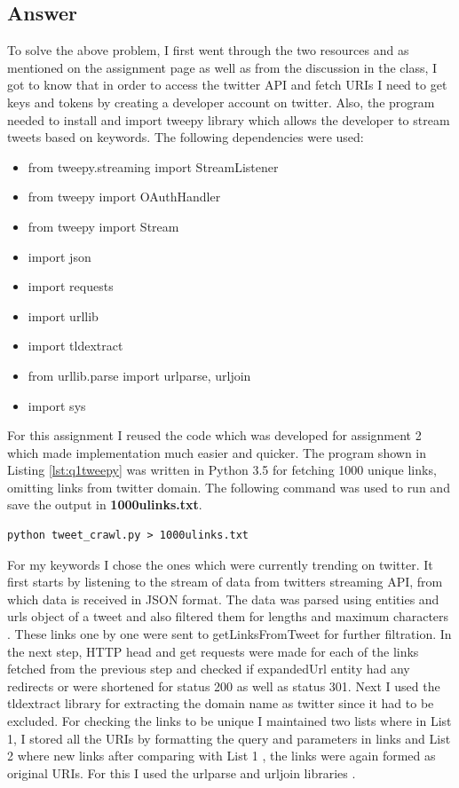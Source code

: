 \documentclass[letterpaper,11pt]{article}
\begin{document}
\subsection*{Answer}
To solve the above problem, I first went through the two resources \cite{twitterref} and \cite{twitterstreamref} as mentioned on the assignment page as well as from the discussion in the class, I got to know that in order to access the twitter API and fetch URIs I need to get keys and tokens by creating a developer account on twitter.
Also, the program needed to install and import tweepy library which allows the developer to stream tweets based on keywords. The following dependencies were used:
\begin{itemize}
  \item from tweepy.streaming import StreamListener
  \item from tweepy import OAuthHandler
  \item from tweepy import Stream
  \item import json
  \item import requests
  \item import urllib
  \item	import tldextract
  \item	from urllib.parse import urlparse, urljoin
  \item	import sys

\end{itemize}
For this assignment I reused the code which was developed for assignment 2 which made implementation much easier and quicker. The program shown in Listing \ref{lst:q1tweepy} was written in Python 3.5 for fetching 1000 unique links, omitting links from twitter domain. The following command was used to run and save the output in \textbf{1000ulinks.txt}.
\begin{lstlisting}[frame=single]
python tweet_crawl.py > 1000ulinks.txt
\end{lstlisting}


For my keywords I chose the ones which were currently trending on twitter. It first starts by listening to the stream of data from twitters streaming API, from which data is received in JSON format. The data was parsed using entities and urls object of a tweet and also filtered them for lengths and maximum characters \cite{streamref}. These links one by one were sent to getLinksFromTweet for further filtration.
In the next step, HTTP head and get requests \cite{urllibref} were made for each of the links fetched from the previous step and checked if expandedUrl entity had any redirects or were shortened for status 200 as well as status 301. Next I used the tldextract \cite{tlderef} library for extracting the domain name as twitter since it had to be excluded. For checking the links to  be unique I maintained two lists where in List 1,  I stored all the URIs by formatting the query and parameters in links and List 2 where new links after comparing with List 1 , the links were again formed as original URIs. For this I used the urlparse and urljoin libraries \cite{parseref}.
\end{document}
